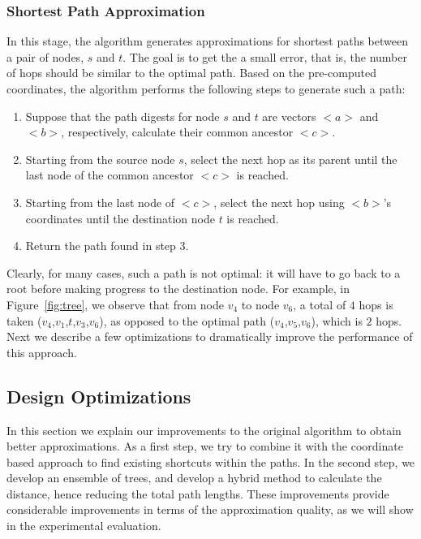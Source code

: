 \subsubsection{Shortest Path Approximation}

In this stage, the algorithm generates approximations for shortest paths between a pair of nodes, $s$ and $t$. The goal is to get the a small error, that is, the number of hops should be similar to the optimal path. Based on the pre-computed coordinates, the algorithm performs the following steps to generate such a path:

\begin{enumerate}
  \item Suppose that the path digests for node $s$ and $t$ are vectors $<a>$ and $<b>$, respectively, calculate their common ancestor $<c>$.
  \item Starting from the source node $s$, select the next hop as its parent until the last node of the common ancestor $<c>$ is reached.
  \item Starting from the last node of $<c>$, select the next hop using $<b>$'s coordinates until the destination node $t$ is reached.
  \item Return the path found in step 3.
\end{enumerate}

Clearly, for many cases, such a path is not optimal: it will have to go back to a root before making progress to the destination node. For example, in Figure~\ref{fig:tree}, we observe that from node $v_4$ to node $v_6$, a total of $4$ hops is taken ($v_4$,$v_1$,$t$,$v_3$,$v_6$), as opposed to the optimal path ($v_4$,$v_5$,$v_6$), which is $2$ hops. Next we describe a few optimizations to dramatically improve the performance of this approach.

\subsection{Design Optimizations}

In this section we explain our improvements to the original algorithm to obtain better approximations. As a first
step, we try to combine it with the coordinate based approach to find existing shortcuts within the paths. In the second step, we develop an ensemble of trees, and develop a hybrid method to calculate the distance, hence reducing the total path lengths. These improvements provide considerable
improvements in terms of the approximation quality, as
we will show in the experimental evaluation.

